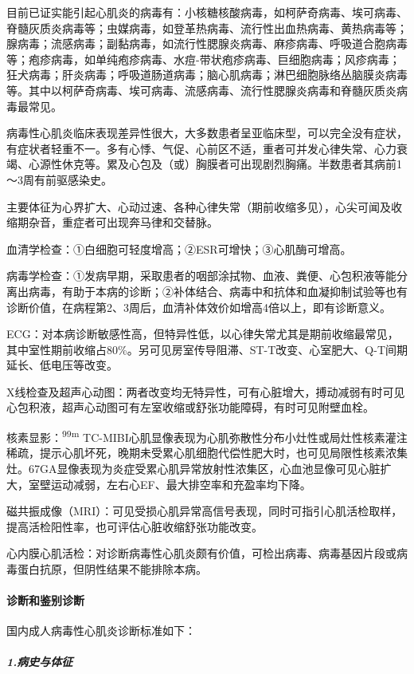 目前已证实能引起心肌炎的病毒有：小核糖核酸病毒，如柯萨奇病毒、埃可病毒、脊髓灰质炎病毒等；虫媒病毒，如登革热病毒、流行性出血热病毒、黄热病毒等；腺病毒；流感病毒；副黏病毒，如流行性腮腺炎病毒、麻疹病毒、呼吸道合胞病毒等；疱疹病毒，如单纯疱疹病毒、水痘-带状疱疹病毒、巨细胞病毒；风疹病毒；狂犬病毒；肝炎病毒；呼吸道肠道病毒；脑心肌病毒；淋巴细胞脉络丛脑膜炎病毒等。其中以柯萨奇病毒、埃可病毒、流感病毒、流行性腮腺炎病毒和脊髓灰质炎病毒最常见。

病毒性心肌炎临床表现差异性很大，大多数患者呈亚临床型，可以完全没有症状，有症状者轻重不一。多有心悸、气促、心前区不适，重者可并发心律失常、心力衰竭、心源性休克等。累及心包及（或）胸膜者可出现剧烈胸痛。半数患者其病前1～3周有前驱感染史。

主要体征为心界扩大、心动过速、各种心律失常（期前收缩多见），心尖可闻及收缩期杂音，重症者可出现奔马律和交替脉。

血清学检查：①白细胞可轻度增高；②ESR可增快；③心肌酶可增高。

病毒学检查：①发病早期，采取患者的咽部涂拭物、血液、粪便、心包积液等能分离出病毒，有助于本病的诊断；②补体结合、病毒中和抗体和血凝抑制试验等也有诊断价值，在病程第2、3周后，血清补体效价如增高4倍以上，即有诊断意义。

ECG：对本病诊断敏感性高，但特异性低，以心律失常尤其是期前收缩最常见，其中室性期前收缩占80\%。另可见房室传导阻滞、ST-T改变、心室肥大、Q-T间期延长、低电压等改变。

X线检查及超声心动图：两者改变均无特异性，可有心脏增大，搏动减弱有时可见心包积液，超声心动图可有左室收缩或舒张功能障碍，有时可见附壁血栓。

核素显影：\textsuperscript{99m}
TC-MIBI心肌显像表现为心肌弥散性分布小灶性或局灶性核素灌注稀疏，提示心肌坏死，晚期未受累心肌细胞代偿性肥大时，也可见局限性核素浓集灶。67GA显像表现为炎症受累心肌异常放射性浓集区，心血池显像可见心脏扩大，室壁运动减弱，左右心EF、最大排空率和充盈率均下降。

磁共振成像（MRI）：可见受损心肌异常高信号表现，同时可指引心肌活检取样，提高活检阳性率，也可评估心脏收缩舒张功能改变。

心内膜心肌活检：对诊断病毒性心肌炎颇有价值，可检出病毒、病毒基因片段或病毒蛋白抗原，但阴性结果不能排除本病。

\paragraph{诊断和鉴别诊断}

国内成人病毒性心肌炎诊断标准如下：

\subparagraph{1.病史与体征}

